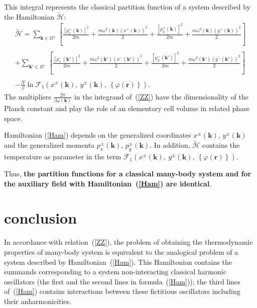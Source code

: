 \documentclass[aps,pre,preprint,floatfix,twoside,tightenlines,showpacs,
showkeys]{revtex4}
\begin{document}
%
%
This integral represents the classical partition function of a system described by the Hamiltonian $\tilde{\mathcal{H}}$:
%
\begin{equation}
\label{Ham}
\begin{array}{r}
{\displaystyle
\tilde{\mathcal{H}} = \sum\limits_{\mathbf{k}\in\Omega^{+}} \left[\frac{\left[p^{+}_{x}\left(\mathbf{k}\right)\right]^{2}}{2m} + \frac{m\omega^{2} \left(\mathbf{k}\right) \left(x^{+}\left(\mathbf{k}\right)\right)^{2}}{2} +
\frac{\left[p^{+}_{y}\left(\mathbf{k}\right)\right]^{2}}{2m} + \frac{m\omega^2\left(\mathbf{k}\right)\left(y^{+} \left(\mathbf{k}\right)\right)^{2}}{2}\right] }\\ \\
{\displaystyle+ 
\sum\limits_{\mathbf{k}'\in\Omega^{-}} \left[\frac{\left[p^{-}_{x}\left(\mathbf{k}'\right)\right]^{2}}{2m} + \frac{m\omega^{2}\left(\mathbf{k}'\right) \left(x^{-}\left(\mathbf{k}'\right)\right)^{2}}{2} + 
\frac{\left[p^{-}_{y}\left(\mathbf{k}'\right)\right]^{2}}{2m} + \frac{m\omega^2\left(\mathbf{k}'\right) \left(y^{-}\left(\mathbf{k}'\right)\right)^{2}}{2}\right]}\\ \\
{\displaystyle -
\frac{N}{\beta}\ln{\mathcal{F}_{1}\left(x^{\pm}\left(\mathbf{k}\right),\ y^{\pm}\left(\mathbf{k}\right),\ \left\{\varphi\left(\mathbf{r}\right)\right\}\right)}}.
\end{array}
\end{equation}
% 
The multipliers $\frac{2\pi}{\beta\omega(\mathbf{k})}$ in the integrand of~(\ref{ZZ}) have the dimensionality of the Planck constant and play the role of an elementary cell volume in related phase space.

Hamiltonian (\ref{Ham}) depends on the generalized coordinates $x^{\pm}\left(\mathbf{k}\right)$,  $y^{\pm}\left(\mathbf{k}\right)$ and the generalized momenta $p^{\pm}_{x}\left(\mathbf{k}\right)$, $p^{\pm}_{y}\left(\mathbf{k}\right)$. In addition, $\tilde{\mathcal{H}}$ contains the temperature as parameter in the term $\mathcal{F}_{1}\left(x^{\pm} \left(\mathbf{k}\right),\ y^{\pm}\left(\mathbf{k}\right),\ \left\{\varphi\left(\mathbf{r}\right)\right\}\right)$. 
%

Thus, {\bf the partition functions for a classical many-body system and for the auxiliary field with Hamiltonian~(\ref{Ham}) are identical}.

\section{conclusion}
In accordance with relation~(\ref{ZZ}), the problem of obtaining the thermodynamic properties of many-body system is equivalent to the analogical problem of a system described by Hamiltonian~(\ref{Ham}). This Hamiltonian contains the summands corresponding to a system non-interacting classical harmonic oscillators (the first and the second lines in formula~(\ref{Ham}));  the third lines of~(\ref{Ham})  contains interactions between these fictitious oscillators including their anharmonicities. 
\end{document}

